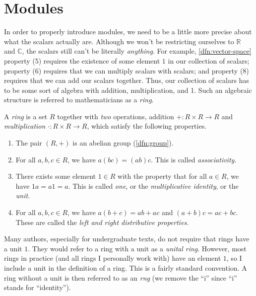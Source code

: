 \section{Modules}

In order to properly introduce modules, we need to be a little more precise about what the scalars actually are. Although we won't be restricting ourselves to $\mathbb{R} $ and $\mathbb{C} $, the scalars still can't be literally \emph{anything}. For example, \cref{dfn:vector-space} property (5) requires the existence of some element $1$ in our collection of scalars; property (6) requires that we can multiply scalars with scalars; and property (8) requires that we can add our scalars together. Thus, our collection of scalars has to be some sort of algebra with addition, multiplication, and 1. Such an algebraic structure is referred to mathematicians as a \emph{ring}.

\begin{definition}\label{dfn:ring}
	A \emph{ring} is a set $R$ together with \emph{two} operations, addition $+: R\times R \to R$ and \emph{multiplication} $\cdot : R\times R \to R$, which satisfy the following properties.
	\begin{enumerate}
		\item The pair $(R,+)$ is an abelian group (\cref{dfn:group}).
		\item For all $a,b,c\in R$, we have $a(bc)=(ab)c$. This is called \emph{associativity}.
		\item There exists some element $1\in R$ with the property that for all $a\in R$, we have $1a=a1=a$. This is called \emph{one}, or the \emph{multiplicative identity}, or the \emph{unit}.
		\item For all $a,b,c\in R$, we have $a(b+c)=ab+ac$ and $(a+b)c=ac+bc$. These are called the \emph{left and right distributive properties}.
	\end{enumerate}
\end{definition}

\begin{remark}\label{rmk:rng}
	Many authors, especially for undergraduate texts, do not require that rings have a unit $1$. They would refer to a ring with a unit as a \emph{unital ring}. However, most rings in practice (and all rings I personally work with) have an element $1$, so I include a unit in the definition of a ring. This is a fairly standard convention. A ring without a unit is then referred to as an \emph{rng} (we remove the ``i'' since ``i'' stands for ``identity'').
\end{remark}

